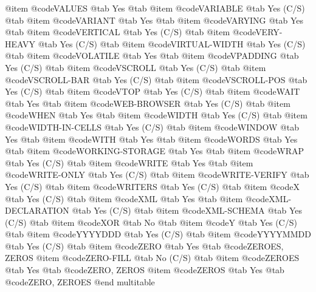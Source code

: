 @item @code{VALUES} @tab Yes @tab 
@item @code{VARIABLE} @tab Yes	(C/S) @tab 
@item @code{VARIANT} @tab Yes @tab 
@item @code{VARYING} @tab Yes @tab 
@item @code{VERTICAL} @tab Yes	(C/S) @tab 
@item @code{VERY-HEAVY} @tab Yes	(C/S) @tab 
@item @code{VIRTUAL-WIDTH} @tab Yes	(C/S) @tab 
@item @code{VOLATILE} @tab Yes @tab 
@item @code{VPADDING} @tab Yes	(C/S) @tab 
@item @code{VSCROLL} @tab Yes	(C/S) @tab 
@item @code{VSCROLL-BAR} @tab Yes	(C/S) @tab 
@item @code{VSCROLL-POS} @tab Yes	(C/S) @tab 
@item @code{VTOP} @tab Yes	(C/S) @tab 
@item @code{WAIT} @tab Yes @tab 
@item @code{WEB-BROWSER} @tab Yes	(C/S) @tab 
@item @code{WHEN} @tab Yes @tab 
@item @code{WIDTH} @tab Yes	(C/S) @tab 
@item @code{WIDTH-IN-CELLS} @tab Yes	(C/S) @tab 
@item @code{WINDOW} @tab Yes @tab 
@item @code{WITH} @tab Yes @tab 
@item @code{WORDS} @tab Yes @tab 
@item @code{WORKING-STORAGE} @tab Yes @tab 
@item @code{WRAP} @tab Yes	(C/S) @tab 
@item @code{WRITE} @tab Yes @tab 
@item @code{WRITE-ONLY} @tab Yes	(C/S) @tab 
@item @code{WRITE-VERIFY} @tab Yes	(C/S) @tab 
@item @code{WRITERS} @tab Yes	(C/S) @tab 
@item @code{X} @tab Yes	(C/S) @tab 
@item @code{XML} @tab Yes @tab 
@item @code{XML-DECLARATION} @tab Yes	(C/S) @tab 
@item @code{XML-SCHEMA} @tab Yes	(C/S) @tab 
@item @code{XOR} @tab No @tab 
@item @code{Y} @tab Yes	(C/S) @tab 
@item @code{YYYYDDD} @tab Yes	(C/S) @tab 
@item @code{YYYYMMDD} @tab Yes	(C/S) @tab 
@item @code{ZERO} @tab Yes @tab @code{ZEROES, ZEROS}
@item @code{ZERO-FILL} @tab No	(C/S) @tab 
@item @code{ZEROES} @tab Yes @tab @code{ZERO, ZEROS}
@item @code{ZEROS} @tab Yes @tab @code{ZERO, ZEROES}
@end multitable


